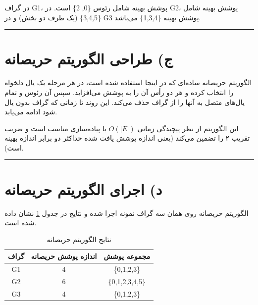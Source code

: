 \documentclass[11pt,a4paper]{article}
\newcommand{\en}[1]{\textenglish{#1}}
\newcommand{\separator}{\vspace{1em}\noindent\rule{\linewidth}{0.4pt}\vspace{1em}}
\begin{document}
در گراف \en{G1}، پوشش بهینه شامل رئوس \{0, 2\} است. در \en{G2}، پوشش بهینه شامل \{3,4,5\} (یک طرف دو بخش) و در \en{G3} پوشش بهینه \{1,3,4\} می‌باشد.

\separator

\section{ج) طراحی الگوریتم حریصانه}
الگوریتم حریصانه ساده‌ای که در اینجا استفاده شده است، در هر مرحله یک یال دلخواه را انتخاب کرده و هر دو رأس آن را به پوشش می‌افزاید. سپس آن رئوس و تمام یال‌های متصل به آنها را از گراف حذف می‌کند. این روند تا زمانی که گراف بدون یال شود ادامه می‌یابد.

\begin{center}
\end{center}

این الگوریتم از نظر پیچیدگی زمانی \( O(|E|) \) با پیاده‌سازی مناسب است و ضریب تقریب ۲ را تضمین می‌کند (یعنی اندازه پوشش یافت شده حداکثر دو برابر اندازه بهینه است).

\separator
\newpage

\section{د) اجرای الگوریتم حریصانه}
الگوریتم حریصانه روی همان سه گراف نمونه اجرا شده و نتایج در جدول \ref{tab:greedy} نشان داده شده است.

\begin{table}[h!]
\centering
\caption{نتایج الگوریتم حریصانه}
\label{tab:greedy}
\begin{tabular}{|c|c|c|}
\hline
\textbf{گراف} & \textbf{اندازه پوشش حریصانه} & \textbf{مجموعه پوشش} \\
\hline
\en{G1} & 4 & \{0,1,2,3\} \\
\en{G2} & 6 & \{0,1,2,3,4,5\} \\
\en{G3} & 4 & \{0,1,2,3\} \\
\hline
\end{tabular}
\end{table}
\end{document}
